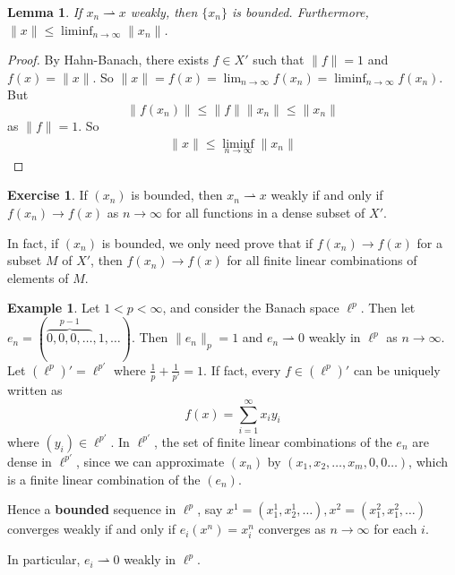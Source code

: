 \documentclass[10pt, oneside, reqno]{amsart}
\theoremstyle{plain}%
\newtheorem{lem}[thm]{Lemma}
\numberwithin{equation}{section}
\theoremstyle{definition}
\newtheorem{exmp}[thm]{Example}
\newtheorem{exer}[thm]{Exercise}
\theoremstyle{remark}
\begin{document}
\begin{lem}
	If $x_n \rightharpoonup x$ weakly, then $\{ x_n \}$ is bounded. Furthermore, $\| x \| \leq \liminf_{n \rightarrow \infty} \| x_n \|$.    
\end{lem}

\begin{proof}
	By Hahn-Banach, there exists $f \in X'$ such that $\| f \| = 1$ and $f(x) = \| x \|$.  So $\| x \| = f(x) = \lim_{n \rightarrow \infty} f(x_n) = \liminf_{n \rightarrow \infty} f(x_n)$.  But \[
		\| f(x_n) \| \leq \| f \| \| x_n \| \leq \| x_n \| 
	\] as $\| f \| = 1$.  So \begin{align*}
		\| x \| \leq \liminf_{n \rightarrow \infty} \| x_n \|
	\end{align*}
	
\end{proof}  

\begin{exer}
	If $(x_n)$ is bounded, then $x_n \rightharpoonup x$ weakly if and only if $f(x_n) \rightarrow f(x)$ as $n \rightarrow \infty$ for all functions in a dense subset of $X'$. 
	
	In fact, if $(x_n)$ is bounded, we only need prove that if $f(x_n) \rightarrow f(x)$ for a subset $M$ of $X'$, then $f(x_n) \rightarrow f(x)$ for all finite linear combinations of elements of $M$.     
\end{exer}

\begin{exmp}
	Let $1 < p < \infty$, and consider the Banach space $\ell^p$.  Then let $e_n = (\overbrace{0, 0, 0, \dots}^{p-1}, 1, \dots)$.  Then $\| e_n \|_p = 1$ and $e_n \rightharpoonup 0$ weakly in $\ell^p$ as $n \rightarrow \infty$.  Let $\left(\ell^p \right)' = \ell^{p'}$ where $\frac{1}{p} + \frac{1}{p'} = 1$.  If fact, every $f \in \left( \ell^p \right)'$ can be uniquely written as \[
		f(x) = \sum_{i=1}^\infty x_i y_i
	\] where $(y_i) \in \ell^{p'}$.  In $\ell^{p'}$, the set of finite linear combinations of the $e_n$ are dense in $\ell^{p'}$, since we can approximate $(x_n)$ by $(x_1, x_2,\dots, x_m, 0, 0 \dots)$, which is a finite linear combination of the $(e_n)$.  
	
	Hence a \textbf{bounded} sequence in $\ell^p$, say $x^1 = (x^1_1, x^1_2, \dots), x^2 = (x^2_1, x^2_1, \dots)$ converges weakly if and only if $e_i(x^n) = x^n_i$ converges as $n \rightarrow \infty$ for each $i$.

	In particular, $e_i \rightharpoonup 0$ weakly in $\ell^p$.  
\end{exmp}
\end{document}
